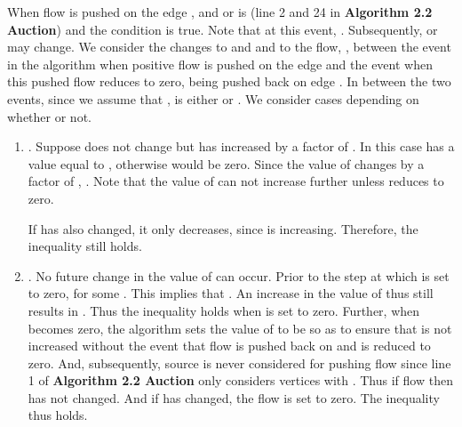 \documentclass[11pt]{article}
\newenvironment{proof}{\par\noindent{\bf Proof:}}{\mbox{}\hfill\\}
\newcommand{\ignore}[1]{ }
\begin{document}
\begin{proof}
When flow is pushed on the edge ,  and 
 or is 
(line 2 and 24 in {\bf Algorithm 2.2 Auction}) and the condition is true. 
Note that at this event, .
Subsequently,  or  may change.
We consider the changes 
to  and  and 
to the flow, , between the event in the algorithm
when positive flow is pushed on the edge  and the event when
this pushed flow reduces to zero, being pushed back on edge .
In between the two events, since we assume that ,   is either  or
.
We consider cases
depending on whether  or not.
\begin{enumerate}

\item
. Suppose  does not change but  has
increased by a factor of  .
In this case   has a value equal to , otherwise 
would be zero.
Since the value of   changes 
by a factor of , . 
Note that the value of  can not
increase further unless  reduces to zero.


If  has also changed, it only decreases, 
since  is increasing. 
Therefore, the inequality still holds. 

\ignore{
In every iteration of the algorithm, after possible modification of
,  is recomputed. Note that  can
only increase by a factor of . 
Further note that  during the course of the
algorithm. 
The first time that ,
 becomes zero 
and  is set to  so as to
ensure that flow is pushed back on edge . 
This would result in  possibly becoming zero.
Also, subsequently source  is never considered  for pushing
flow  since line 1 of {\bf Algorithm 2.2 Auction} only
considers vertices with .
Thus  would only increase if .
We consider cases
based on the value of  computed in line 24 of the algorithm,
{\bf Algorithm 2.2 Auction}:

\begin{enumerate}
}
\item
. No future change in the value of  can occur.
Prior to the step at which  is set to zero,
 for some .
This implies that . An increase in
the value of  thus  still results in
.
Thus the inequality holds when  is set to zero.
Further, when  becomes zero, 
the algorithm  sets the value of  to be  so as to
ensure that  is not increased without the event that
flow is pushed back on   and  is reduced to zero. 
And, subsequently, source  is never considered  for pushing
flow  since line 1 of {\bf Algorithm 2.2 Auction} only
considers vertices with .
Thus if flow  then  has not changed. And if
 has changed, the flow is set to zero.
The inequality thus holds.


\end{enumerate}
\end{proof}
\end{document}
